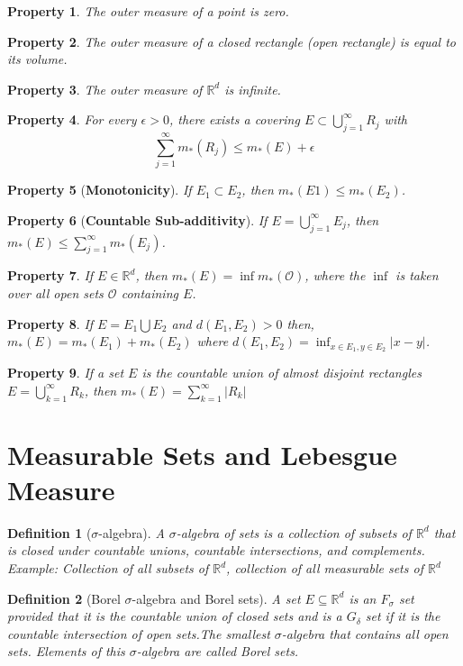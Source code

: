\documentclass{report}
\theoremstyle{upthm}
\newtheorem{defn}{Definition}
\newtheorem{property}{Property}
\newcommand{\reals}{\mathbb{R}}
\newcommand{\calO}{{\mathcal{O}}}
\newcommand{\tb}[1]{{\textbf{#1}}}
\newcommand{\union}{\bigcup}
\newcommand{\vl}{\Big|}
\begin{document}
\begin{property}
	The outer measure of a point is zero.
\end{property}
\begin{property}
	The outer measure of a closed rectangle (open rectangle) is equal to its volume.
\end{property}
\begin{property}
	The outer measure of $\reals^d$ is infinite.
\end{property}
\begin{property}
	For every $\epsilon > 0$, there exists a covering $E \subset \union_{j=1}^{\infty} R_j$  with
	$$ \sum_{j=1}^{\infty} m_*(R_j) \leq m_*(E) + \epsilon $$
\end{property}
\begin{property}[\tb{Monotonicity}]
	If $E_1 \subset E_2$, then $m_*(E1) \leq m_*(E_2)$.
\end{property}

\begin{property}[\tb{Countable Sub-additivity}]
	If $E = \union_{j=1}^{\infty} E_j $, then $ m_*(E) \leq \sum_{j=1}^{\infty} m_*(E_j)$.
\end{property}

\begin{property}
	If $E \in \reals^d$, then $m_*(E) = \inf m_*(\calO)$, where the $\inf$ is taken over all open sets $\calO$ containing $E$.
\end{property}

\begin{property}
	If $E = E_1 \union E_2$ and $d(E_1, E_2) > 0$ then, $m_*(E) = m_*(E_1) + m_*(E_2)$ where $d(E_1, E_2) = \inf_{x \in E_1, y \in E_2} \vl x - y \vl$. 
\end{property}

\begin{property}
	If a set $E$ is the countable union of almost disjoint rectangles $ E = \union_{k=1}^{\infty} R_k $, then $m_*(E) = \sum_{k=1}^{\infty} \vl R_k \vl$
\end{property}

\section{Measurable Sets and Lebesgue Measure}
\begin{defn}[$\sigma$-algebra]
	A $\sigma$-algebra of sets is a collection of subsets of $\reals^d$ that is closed under countable unions, countable intersections, and complements. Example: Collection of all subsets of $\reals^d$, collection of all measurable sets of $\reals^d$
\end{defn}
\begin{defn}[Borel $\sigma$-algebra and Borel sets]
	A set $E \subseteq \reals^d $ is an $F_\sigma$ set provided that it is the countable union of closed	sets and is a $G_\delta$ set if it is the countable intersection of open sets.The smallest $\sigma$-algebra that contains all open sets. Elements of this $\sigma$-algebra are called	Borel sets.
\end{defn}
\end{document}
